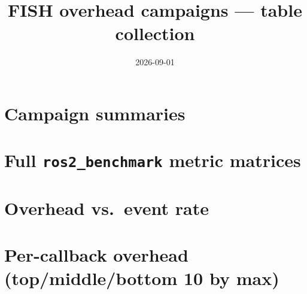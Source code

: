\documentclass[10pt]{article}
\title{FISH overhead campaigns --- table collection}
\author{}
\date{2026-09-01}
\begin{document}
\maketitle
\listoftables
\clearpage

\section{Campaign summaries}




\clearpage
\section{Full \texttt{ros2\_benchmark} metric matrices}



\clearpage
\section{Overhead vs.\ event rate}


\clearpage
\section{Per-callback overhead (top/middle/bottom 10 by max)}


\clearpage


\end{document}
